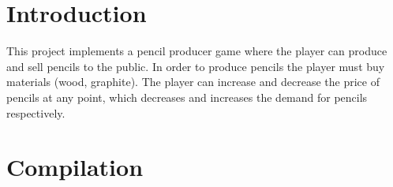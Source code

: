 \hypertarget{index_intro_sec}{}\section{Introduction}\label{index_intro_sec}
This project implements a pencil producer game where the player can produce and sell pencils to the public. In order to produce pencils the player must buy materials (wood, graphite). The player can increase and decrease the price of pencils at any point, which decreases and increases the demand for pencils respectively. \hypertarget{index_compile_sec}{}\section{Compilation}\label{index_compile_sec}

\begin{DoxyCode}{0}
\DoxyCodeLine{}
\DoxyCodeLine{}
\DoxyCodeLine{}
\DoxyCodeLine{}
\end{DoxyCode}
 